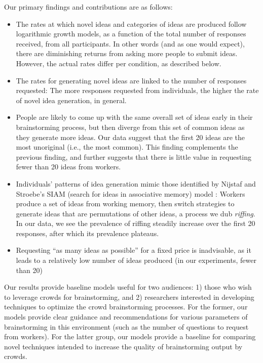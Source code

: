 Our primary findings and contributions are as follows:
\begin{itemize}
\item The rates at which novel ideas and categories of ideas are produced follow logarithmic growth models, as a function of the total number of responses received, from all participants. In other words (and as one would expect), there are diminishing returns from asking more people to submit ideas. However, the actual rates differ per condition, as described below.
\item The rates for generating novel ideas are linked to the number of responses requested: The more responses requested from individuals, the higher the rate of novel idea generation, in general.
\item People are likely to come up with the same overall set of ideas early in their brainstorming process, but then diverge from this set of common ideas as they generate more ideas. Our data suggest that the first 20 ideas are the most unoriginal (i.e., the most common). This finding complements the previous finding, and further suggests that there is little value in requesting fewer than 20 ideas from workers.
\item Individuals' patterns of idea generation mimic those identified by Nijstaf and Stroebe's SIAM (search for ideas in associative memory) model \cite{nijstad_how_2006}: Workers produce a set of ideas from working memory, then switch strategies to generate ideas that are permutations of other ideas, a process we dub {\em riffing\/}. In our data, we see the prevalence of riffing steadily increase over the first 20 responses, after which its prevalence plateaus.
\item Requesting ``as many ideas as possible'' for a fixed price is inadvisable, as it leads to a relatively low number of ideas produced (in our experiments, fewer than 20)
\end{itemize}

Our results provide baseline models useful for two audiences: 1) those who wish to leverage crowds for brainstorming, and 2) researchers interested in developing techniques to optimize the crowd brainstorming processes. For the former, our models provide clear guidance and recommendations for various parameters of brainstorming in this environment (such as the number of questions to request from workers). For the latter group, our models provide a baseline for comparing novel techniques intended to increase the quality of brainstorming output by crowds.

